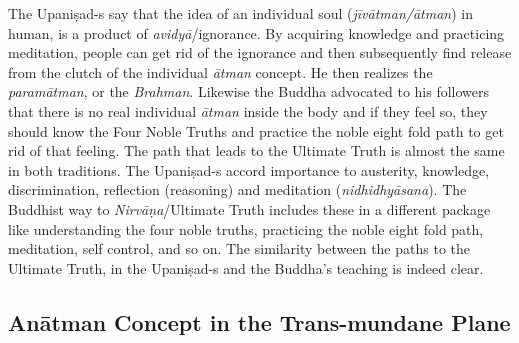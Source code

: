 The Upaniṣad-s say that the idea of an individual soul (\textit{jīvātman/ātman}) in human, is a product of \textit{avidyā}/ignorance. By acquiring knowledge and practicing meditation, people can get rid of the ignorance and then subsequently find release from the clutch of the individual \textit{ātman} concept. He then realizes the \textit{paramātman}, or the \textit{Brahman}. Likewise the Buddha advocated to his followers that there is no real individual \textit{ātman} inside the body and if they feel so, they should know the Four Noble Truths and practice the noble eight fold path to get rid of that feeling. The path that leads to the Ultimate Truth is almost the same in both traditions. The Upaniṣad-s accord importance to austerity, knowledge, discrimination, reflection (reasoning) and meditation (\textit{nidhidhyāsana}). The Buddhist way to \textit{Nirvāṇa}/Ultimate Truth includes these in a different package like understanding the four noble truths, practicing the noble eight fold path, meditation, self control, and so on. The similarity between the paths to the Ultimate Truth, in the Upaniṣad-s and the Buddha’s teaching is indeed clear.

\vspace{-.3cm}

\subsection*{Anātman Concept in the Trans-mundane Plane}

